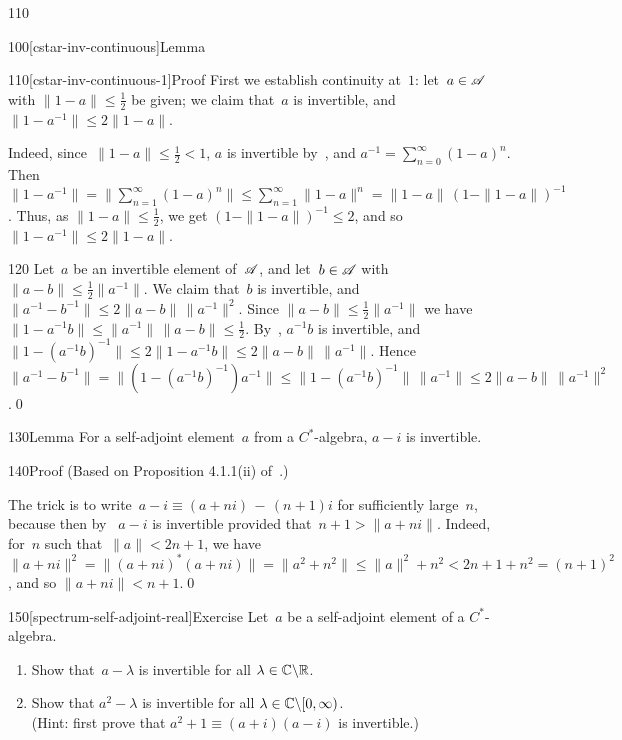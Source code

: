 \begin{parsec}{110}
\begin{point}{100}[cstar-inv-continuous]{Lemma}
\begin{point}{110}[cstar-inv-continuous-1]{Proof}
First we establish continuity at~$1$:
let~$a\in\mathscr{A}$ with $\|1-a\|\leq \frac{1}{2}$ be given;
we claim that~$a$ is invertible,
and~$\|1-a^{-1}\| \leq 2\|1-a\|$.

Indeed, since~$\|1-a\|\leq \frac{1}{2}<1$,
$a$ is invertible by~,
and $a^{-1}=\sum_{n=0}^\infty (1-a)^n$.
Then~$\|1-a^{-1}\|=\|\sum_{n=1}^\infty (1-a)^n\|\leq \sum_{n=1}^\infty \|1-a\|^n
= \|1-a\|\, (1-\|1-a\|)^{-1}$.
Thus, as $\|1-a\|\leq\frac{1}{2}$,
we get $(1-\|1-a\|)^{-1}\leq 2$,
and so $\|1-a^{-1}\|\leq 2\|1-a\|$.
\begin{point}{120}%
Let~$a$ be an invertible element of~$\mathscr{A}$,
and let~$b\in\mathscr{A}$ with~$\|a-b\|\leq\frac{1}{2}\|a^{-1}\|$.
We claim that~$b$ is invertible,
and~$\|a^{-1}-b^{-1}\|\leq 2\|a-b\|\,\|a^{-1}\|^2$.
Since $\|a-b\|\leq \frac{1}{2}\|a^{-1}\|$
we have
$\|1-a^{-1}b\|\leq \|a^{-1}\|\,\|a-b\|\leq \frac{1}{2}$.
By~, $a^{-1}b$ is invertible,
and $\|1-(a^{-1}b)^{-1}\|\leq 2\|1-a^{-1}b\|\leq 2\|a-b\|\,\|a^{-1}\|$.
Hence $\|a^{-1}-b^{-1}\| = \|(1-(a^{-1}b)^{-1})a^{-1}\|
\leq \|1-(a^{-1}b)^{-1}\|\,\|a^{-1}\|\leq 2 \|a-b\|\,\|a^{-1}\|^2$.\qed
\end{point}
\end{point}
\end{point}
%
%
\begin{point}{130}{Lemma}%
For a self-adjoint element~$a$ from a $C^*$-algebra,
$a-i$ is invertible.
\begin{point}{140}{Proof}%
(Based on Proposition 4.1.1(ii) of~\cite{kr}.)

The trick
is to 
write~$a-i\equiv (a+ni)\,-\,(n+1)i$
for sufficiently large~$n$,
because  
then
by~
$a-i$
is invertible provided that~$n+1 > \|a+ni\|$.
Indeed, for~$n$ such that~$\|a\|<2n+1$,
we have $\|a+ni\|^2 = \|(a+ni)^*(a+ni)\|
= \|a^2+n^2\|
\leq \|a\|^2+n^2 < 2n+1+n^2 = (n+1)^2$,
and so $\|a+ni\| < n+1$.\qed
\end{point}
\end{point}
\begin{point}{150}[spectrum-self-adjoint-real]{Exercise}%
Let~$a$ be a self-adjoint element of a $C^*$-algebra.
\begin{enumerate}
\item
Show that~$a-\lambda$ is invertible for all $\lambda\in \mathbb{C}\backslash \mathbb{R}$.
\item
Show that $a^2-\lambda$ is invertible for all 
$\lambda\in \mathbb{C}\backslash[0,\infty)$.\\
(Hint: first prove that
 $a^2+1 \equiv (a+i)(a-i)$ is invertible.)


\end{enumerate}
\end{point}
\end{parsec}

